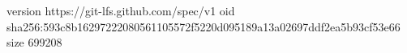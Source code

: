 version https://git-lfs.github.com/spec/v1
oid sha256:593c8b16297222080561105572f5220d095189a13a02697ddf2ea5b93cf53e66
size 699208
